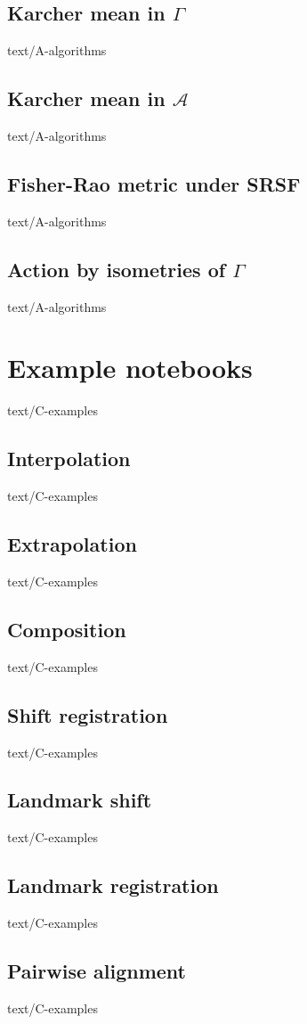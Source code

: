 \documentclass[epsbased,copyleft,final,loe, lof,extendedindex,firstnumbered,tfg,english]{tfgtfmthesisuam}
\begin{document}
  \section{Karcher mean in $\Gamma$\label{SEC:KARCHERG}}{text/A-algorithms}
  \section{Karcher mean in $\mathcal{A}$\label{SEC:KARCHERA}}{text/A-algorithms}
  \section{Fisher-Rao metric under SRSF\label{SEC:MAPPING}}{text/A-algorithms}
  \section{Action by isometries of $\Gamma$\label{SEC:ACTION}}{text/A-algorithms}


\chapter{Example notebooks\label{CAP:EXAMPLES}}{text/C-examples}
	\section{Interpolation\label{EX:INTERPOLATION}}{text/C-examples}
	\section{Extrapolation\label{EX:EXTRAPOLATION}}{text/C-examples}
	\section{Composition\label{EX:COMPOSITION}}{text/C-examples}
	\section{Shift registration\label{EX:SHIFT}}{text/C-examples}
	\section{Landmark shift\label{EX:LANDSHIFT}}{text/C-examples}
	\section{Landmark registration\label{EX:LANDMARKREG}}{text/C-examples}
	\section{Pairwise alignment\label{EX:PAIRWISE}}{text/C-examples}
\end{document}

